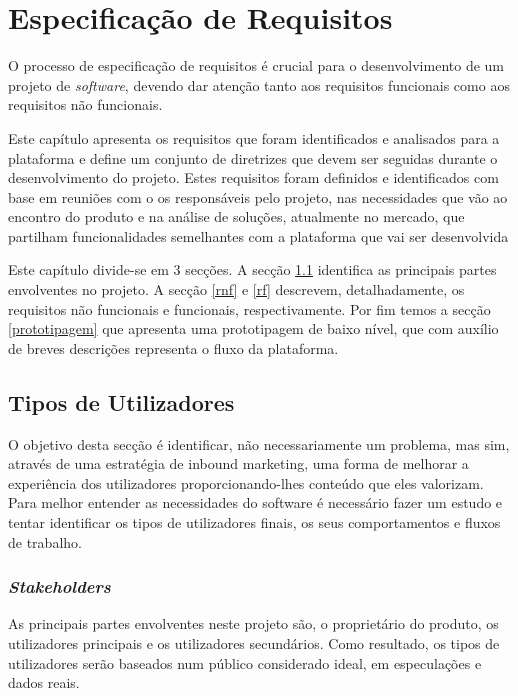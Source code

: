 \chapter{Especificação de Requisitos}
\label{sec:requisitos}

O processo de especificação de requisitos é crucial para o desenvolvimento de um projeto de \textit{software}, devendo dar atenção tanto aos requisitos funcionais como aos requisitos não funcionais.

Este capítulo apresenta os requisitos que foram identificados e analisados para a plataforma e define um conjunto de diretrizes que devem ser seguidas durante o desenvolvimento do projeto. Estes requisitos foram definidos e identificados com base em reuniões com o os responsáveis pelo projeto, nas necessidades que vão ao encontro do produto e na análise de soluções, atualmente no mercado, que partilham funcionalidades semelhantes com a plataforma que vai ser desenvolvida

Este capítulo divide-se em 3 secções. A secção \ref{requisitos:tiposutilizadores} identifica as principais partes envolventes no projeto. A secção \ref{rnf} e \ref{rf} descrevem,  detalhadamente, os requisitos não funcionais e funcionais, respectivamente. Por fim temos a secção \ref{prototipagem} que apresenta uma prototipagem de baixo nível, que com auxílio de breves descrições representa o fluxo da plataforma.


\section{Tipos de Utilizadores}
\label{requisitos:tiposutilizadores}

O objetivo desta secção é identificar, não necessariamente um problema, mas sim, através de uma estratégia de inbound marketing, uma forma de melhorar a experiência dos utilizadores proporcionando-lhes conteúdo que eles valorizam. Para melhor entender as necessidades do software é necessário fazer um estudo e tentar identificar os tipos de utilizadores finais, os seus comportamentos e fluxos de trabalho.


\subsection{\textit{Stakeholders}}

As principais partes envolventes neste projeto são, o proprietário do produto, os utilizadores principais e os utilizadores secundários. Como resultado, os tipos de utilizadores serão baseados num público considerado ideal, em especulações e dados reais.


